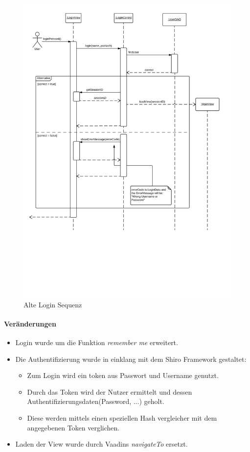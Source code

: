 \begin{figure}
  \centering
    \includegraphics[width=\linewidth]{Login-Sequenz.pdf}
   \caption{Alte Login Sequenz}
\end{figure}

\paragraph{Veränderungen}
\begin{itemize}
    \item Login wurde um die Funktion \emph{remember me} erweitert.
    \item Die Authentifizierung wurde in einklang mit dem Shiro Framework gestaltet:
    \begin{itemize}
        \item Zum Login wird ein token aus Passwort und Username genutzt.
        \item Durch das Token wird der Nutzer ermittelt und dessen Authentifizierungsdaten(Password, ...) geholt.
        \item Diese werden mittels einen speziellen Hash vergleicher mit dem angegebenen Token verglichen.
    \end{itemize}
    \item Laden der View wurde durch Vaadins \emph{navigateTo} ersetzt.
\end{itemize}

